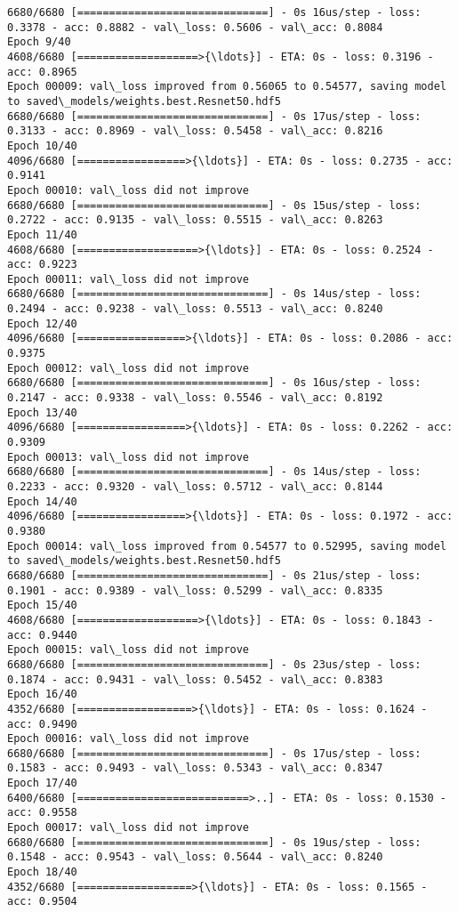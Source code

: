 \documentclass[11pt]{article}
\begin{document}
\begin{Verbatim}[commandchars=\\\{\}]
6680/6680 [==============================] - 0s 16us/step - loss: 0.3378 - acc: 0.8882 - val\_loss: 0.5606 - val\_acc: 0.8084
Epoch 9/40
4608/6680 [===================>{\ldots}] - ETA: 0s - loss: 0.3196 - acc: 0.8965
Epoch 00009: val\_loss improved from 0.56065 to 0.54577, saving model to saved\_models/weights.best.Resnet50.hdf5
6680/6680 [==============================] - 0s 17us/step - loss: 0.3133 - acc: 0.8969 - val\_loss: 0.5458 - val\_acc: 0.8216
Epoch 10/40
4096/6680 [=================>{\ldots}] - ETA: 0s - loss: 0.2735 - acc: 0.9141
Epoch 00010: val\_loss did not improve
6680/6680 [==============================] - 0s 15us/step - loss: 0.2722 - acc: 0.9135 - val\_loss: 0.5515 - val\_acc: 0.8263
Epoch 11/40
4608/6680 [===================>{\ldots}] - ETA: 0s - loss: 0.2524 - acc: 0.9223
Epoch 00011: val\_loss did not improve
6680/6680 [==============================] - 0s 14us/step - loss: 0.2494 - acc: 0.9238 - val\_loss: 0.5513 - val\_acc: 0.8240
Epoch 12/40
4096/6680 [=================>{\ldots}] - ETA: 0s - loss: 0.2086 - acc: 0.9375
Epoch 00012: val\_loss did not improve
6680/6680 [==============================] - 0s 16us/step - loss: 0.2147 - acc: 0.9338 - val\_loss: 0.5546 - val\_acc: 0.8192
Epoch 13/40
4096/6680 [=================>{\ldots}] - ETA: 0s - loss: 0.2262 - acc: 0.9309
Epoch 00013: val\_loss did not improve
6680/6680 [==============================] - 0s 14us/step - loss: 0.2233 - acc: 0.9320 - val\_loss: 0.5712 - val\_acc: 0.8144
Epoch 14/40
4096/6680 [=================>{\ldots}] - ETA: 0s - loss: 0.1972 - acc: 0.9380
Epoch 00014: val\_loss improved from 0.54577 to 0.52995, saving model to saved\_models/weights.best.Resnet50.hdf5
6680/6680 [==============================] - 0s 21us/step - loss: 0.1901 - acc: 0.9389 - val\_loss: 0.5299 - val\_acc: 0.8335
Epoch 15/40
4608/6680 [===================>{\ldots}] - ETA: 0s - loss: 0.1843 - acc: 0.9440
Epoch 00015: val\_loss did not improve
6680/6680 [==============================] - 0s 23us/step - loss: 0.1874 - acc: 0.9431 - val\_loss: 0.5452 - val\_acc: 0.8383
Epoch 16/40
4352/6680 [==================>{\ldots}] - ETA: 0s - loss: 0.1624 - acc: 0.9490
Epoch 00016: val\_loss did not improve
6680/6680 [==============================] - 0s 17us/step - loss: 0.1583 - acc: 0.9493 - val\_loss: 0.5343 - val\_acc: 0.8347
Epoch 17/40
6400/6680 [===========================>..] - ETA: 0s - loss: 0.1530 - acc: 0.9558
Epoch 00017: val\_loss did not improve
6680/6680 [==============================] - 0s 19us/step - loss: 0.1548 - acc: 0.9543 - val\_loss: 0.5644 - val\_acc: 0.8240
Epoch 18/40
4352/6680 [==================>{\ldots}] - ETA: 0s - loss: 0.1565 - acc: 0.9504

\end{Verbatim}
\end{document}
